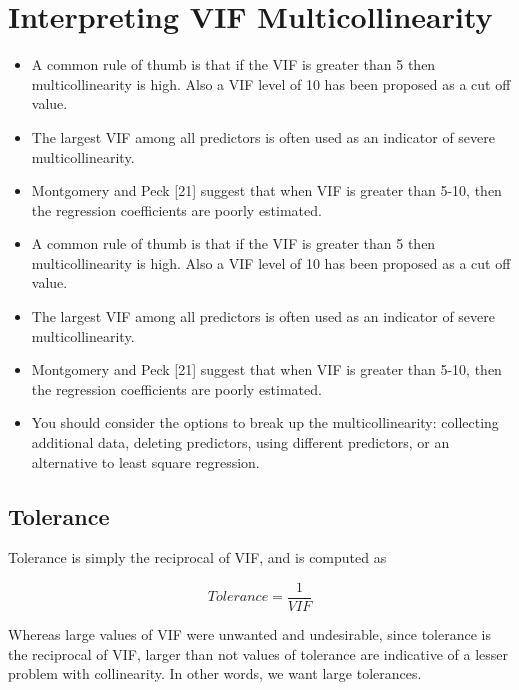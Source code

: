 \documentclass[]{report}
\begin{document}

\section{Interpreting VIF Multicollinearity}

\begin{itemize}
\item  A common rule of thumb is that if the VIF is greater than 5 then multicollinearity is high. Also a VIF
level of 10 has been proposed as a cut off value.
\item  The largest VIF among all predictors is often used as an indicator of severe multicollinearity.
\item  Montgomery and Peck [21] suggest that when VIF is greater than 5-10, then the regression coefficients are poorly estimated.
\item A common rule of thumb is that if the VIF is greater than 5 then multicollinearity is high.
Also a VIF level of 10 has been proposed as a cut off value.
\item The largest VIF among all predictors is often used as an indicator of severe multicollinearity. 
\item Montgomery and Peck [21] suggest that when VIF is greater than 5-10, then the regression coefficients are poorly estimated. \item You should
consider the options to break up the multicollinearity: collecting additional data, deleting
predictors, using different predictors, or an alternative to least square regression.
\end{itemize}

\subsection*{Tolerance}
Tolerance is simply the reciprocal of VIF, and is computed as


\[ Tolerance = \frac{1}{VIF}\]

Whereas large values of VIF were unwanted and undesirable, since tolerance is the reciprocal
of VIF, larger than not values of tolerance are indicative of a lesser problem with collinearity.
In other words, we want large tolerances.


\newpage
\end{document}

